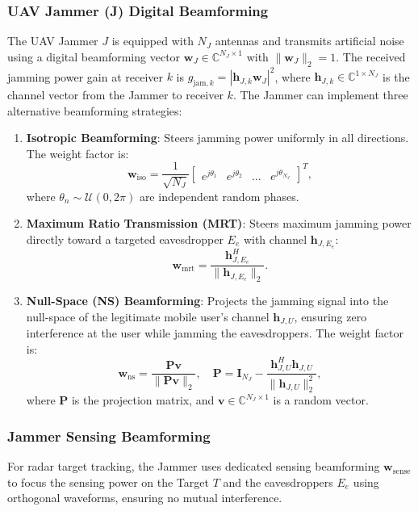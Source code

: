 \documentclass[journal,onecolumn]{IEEEtran}
\begin{document}
\subsubsection{UAV Jammer (J) Digital Beamforming}
The UAV Jammer $J$ is equipped with $N_J$ antennas and transmits artificial noise using a digital beamforming vector $\mathbf{w}_J \in \mathbb{C}^{N_J \times 1}$ with $\|\mathbf{w}_J\|_2 = 1$. The received jamming power gain at receiver $k$ is $g_{\text{jam}, k} = |\mathbf{h}_{J,k} \mathbf{w}_J|^2$, where $\mathbf{h}_{J,k} \in \mathbb{C}^{1 \times N_J}$ is the channel vector from the Jammer to receiver $k$. The Jammer can implement three alternative beamforming strategies:
\begin{enumerate}
    \item \textbf{Isotropic Beamforming}: Steers jamming power uniformly in all directions. The weight factor is:
    \begin{equation}
        \mathbf{w}_{\text{iso}} = \frac{1}{\sqrt{N_J}} \begin{bmatrix} e^{j\theta_1} & e^{j\theta_2} & \dots & e^{j\theta_{N_J}} \end{bmatrix}^T,
    \end{equation}
    where $\theta_n \sim \mathcal{U}(0, 2\pi)$ are independent random phases.
    \item \textbf{Maximum Ratio Transmission (MRT)}: Steers maximum jamming power directly toward a targeted eavesdropper $E_e$ with channel $\mathbf{h}_{J,E_e}$:
    \begin{equation}
        \mathbf{w}_{\text{mrt}} = \frac{\mathbf{h}_{J,E_e}^H}{\|\mathbf{h}_{J,E_e}\|_2}.
    \end{equation}
    \item \textbf{Null-Space (NS) Beamforming}: Projects the jamming signal into the null-space of the legitimate mobile user's channel $\mathbf{h}_{J,U}$, ensuring zero interference at the user while jamming the eavesdroppers. The weight factor is:
    \begin{equation}
        \mathbf{w}_{\text{ns}} = \frac{\mathbf{P} \mathbf{v}}{\|\mathbf{P} \mathbf{v}\|_2}, \quad \mathbf{P} = \mathbf{I}_{N_J} - \frac{\mathbf{h}_{J,U}^H \mathbf{h}_{J,U}}{\|\mathbf{h}_{J,U}\|_2^2},
    \end{equation}
    where $\mathbf{P}$ is the projection matrix, and $\mathbf{v} \in \mathbb{C}^{N_J \times 1}$ is a random vector.
\end{enumerate}

\subsubsection{Jammer Sensing Beamforming}
For radar target tracking, the Jammer uses dedicated sensing beamforming $\mathbf{w}_{\text{sense}}$ to focus the sensing power on the Target $T$ and the eavesdroppers $E_e$ using orthogonal waveforms, ensuring no mutual interference.
\end{document}

